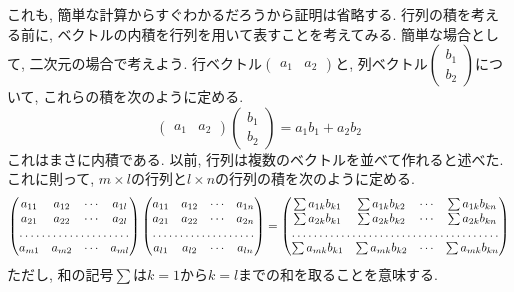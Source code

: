 \documentclass[a4j,dvipdfmx]{jsarticle}
\numberwithin{equation}{section}
\begin{document}
            これも, 簡単な計算からすぐわかるだろうから証明は省略する.
            \clearpage
            行列の積を考える前に, ベクトルの内積を行列を用いて表すことを考えてみる. 簡単な場合として, 二次元の場合で考えよう.
            行ベクトル$\begin{pmatrix}
                a_1 & a_2 
            \end{pmatrix}$と, 列ベクトル$\begin{pmatrix}
                b_1\\b_2
            \end{pmatrix}$について, これらの積を次のように定める.
            \begin{equation*}
                \begin{pmatrix}
                a_1 & a_2 
            \end{pmatrix}\begin{pmatrix}
                b_1\\b_2
            \end{pmatrix}=a_1b_1+a_2b_2
            \end{equation*}
            これはまさに内積である. 以前, 行列は複数のベクトルを並べて作れると述べた. これに則って, $m\times l$の行列と$l\times n$の行列の積を次のように定める.
            \begin{equation}
                \begin{pmatrix}
                    a_{11} & a_{12} & \cdots & a_{1l}\\
                    a_{21} & a_{22} & \cdots & a_{2l}\\
                    \hdotsfor{4}\\
                    a_{m1} & a_{m2} & \cdots & a_{ml}
                \end{pmatrix}
                \begin{pmatrix}
                    a_{11} & a_{12} & \cdots & a_{1n}\\
                    a_{21} & a_{22} & \cdots & a_{2n}\\
                    \hdotsfor{4}\\
                    a_{l1} & a_{l2} & \cdots & a_{ln}
                \end{pmatrix}                    
                =\begin{pmatrix}
                    \sum a_{1k}b_{k1} & \sum a_{1k}b_{k2} & \cdots & \sum a_{1k}b_{kn}\\
                    \sum a_{2k}b_{k1} & \sum a_{2k}b_{k2} & \cdots & \sum a_{2k}b_{kn}\\
                    \hdotsfor{4}\\
                    \sum a_{mk}b_{k1} & \sum a_{mk}b_{k2} & \cdots & \sum a_{mk}b_{kn}
                \end{pmatrix} \label{eq:線形代数:行列の積}
            \end{equation}
            ただし, 和の記号$\sum$は$k=1$から$k=l$までの和を取ることを意味する.
\end{document}
